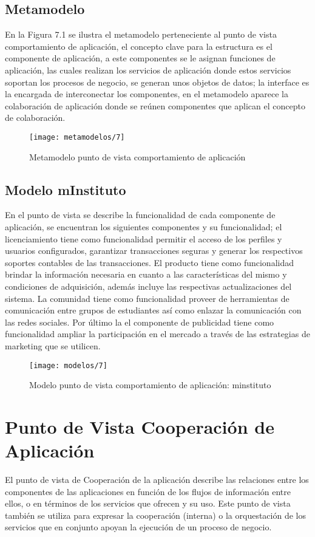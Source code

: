 \subsection{Metamodelo}
En la Figura 7.1 se ilustra el metamodelo perteneciente al punto de vista comportamiento de aplicación, el concepto clave para la estructura es el componente de aplicación, a este componentes se le asignan funciones de aplicación, las cuales realizan los servicios de aplicación donde estos servicios soportan los procesos de negocio, se generan unos objetos de datos; la interface es la encargada de interconectar los componentes, en el metamodelo aparece la colaboración de aplicación donde se reúnen componentes que aplican el concepto
de colaboración.

\begin{figure}[H]
	\centering
	\texttt{[image: metamodelos/7]}
	\captionsetup{width=.95\textwidth}
	\caption{Metamodelo punto de vista comportamiento de aplicación}
	\label{metamodelo7}
\end{figure}

\subsection{Modelo mInstituto}
En el punto de vista se describe la funcionalidad de cada componente de aplicación, se encuentran los siguientes componentes y su funcionalidad; el licenciamiento tiene como funcionalidad permitir el acceso de los perfiles y usuarios configurados, garantizar transacciones seguras y generar los respectivos soportes contables de las transacciones. El producto tiene como funcionalidad brindar la información necesaria en cuanto a las características del mismo y condiciones de adquisición, además incluye las respectivas actualizaciones del sistema. La comunidad tiene como funcionalidad proveer de herramientas de comunicación entre grupos de estudiantes así como enlazar la comunicación con las redes sociales.  Por último la el componente de publicidad tiene como funcionalidad ampliar la participación en el mercado a través de las estrategias de marketing que se utilicen.

\begin{figure}[H]
	\centering
	\texttt{[image: modelos/7]}
	\captionsetup{width=.95\textwidth}
	\caption{Modelo punto de vista comportamiento de aplicación: minstituto}
	\label{modelo7}
\end{figure}

\section{Punto de Vista Cooperación de Aplicación}
El punto de vista de Cooperación de la aplicación describe las relaciones entre los componentes de las aplicaciones en función de los flujos de información entre ellos, o en términos de los servicios que ofrecen y su uso. Este punto de vista también se utiliza para expresar la cooperación (interna) o la orquestación de los servicios que en conjunto apoyan la ejecución de un proceso de negocio.

